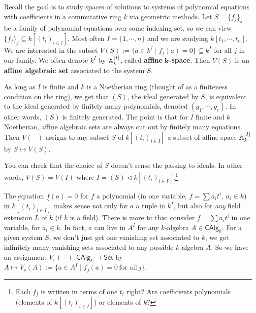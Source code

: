 \orbreak 
Recall the goal is to study spaces of solutions to systems of polynomial equations with coefficients in a commutative ring $k$ via geometric methods. Let $S=\{f_j \}_j  $ be a family of polynomial equations over some indexing set, so we can view $\{f_j \} _j  \subseteq k[(t_i ) _{i \in I}]$. Most often $I=\{1,\cdots ,n\} $ and we are studying $k[t_1,\cdots ,t_n ]$. We are interested in the subset $V(S):= \{a \in k^I \mid f_j (a)=0\} \subseteq k^I$ for all $j$ in our family. We often denote $k^I $ by $\mathbb{A}^{|I|}_k$, called \textbf{affine} $\mathbf k$\textbf{-space}. Then $V(S)$ is an \textbf{affine algebraic set} associated to the system $S$.

\begin{note}
    As long as $I$ is finite and $k$ is a Noetherian ring (thought of as a finiteness condition on the ring), we get that $(S)$, the ideal generated by $S$, is equivalent to the ideal generated by finitely many polynomials, denoted $(g_1,\cdots ,g_r)$. In other words, $(S)$ is finitely generated. The point is that for $I$ finite and $k$ Noetherian, affine algebraic sets are always cut out by finitely many equations. Then $V(-)$ assigns to any subset $S$ of $k[(t_i )_{i \in I}]$ a subset of affine space $\mathbb{A}_k^{|I|}$ by $S \mapsto  V(S)$.

    \begin{ex}
        You can check that the choice of $S$ doesn't sense the passing to ideals. In other words, $V(S)=V(I)$ where  $I=(S) \triangleleft k[(t_i )_{i \in I}]$.\footnote{Each $f_j $ is written in terms of one $t_i $ right? Are coefficients polynomials (elements of $k[(t_i )_{i \in I}]$) or elements of $k$?}
    \end{ex}
\end{note}
The equation $f(a)=0$ for $f$ a polynomial (in one variable, $f=\sum a_i t ^i , \ a_i \in k$) in $k[(t_i )_{i \in I}]$ makes sense not only for $a$ a tuple in $k^I$, but also for \emph{any} field extension $L$ of $k$ (if $k$ is a field). There is more to this: consider $f=\sum a_i t ^i $ in one variable, for $a_i  \in k$. In fact, $a$ can live in $A^I$ for any $k$-algebra $A \in \mathsf{CAlg} _k$. For a given system $S$, we don't just get one vanishing set associated to $k$, we get infinitely many vanishing sets associated to any possible $k$-algebra $A$. So we have an assignment $V_s(-) \colon \mathsf{CAlg} _k \to \mathsf{Set} $ by $A \mapsto V_s(A):= \{a \in A^I \mid  f_j (a)=0 \ \text{for all} \ j\} $. 

